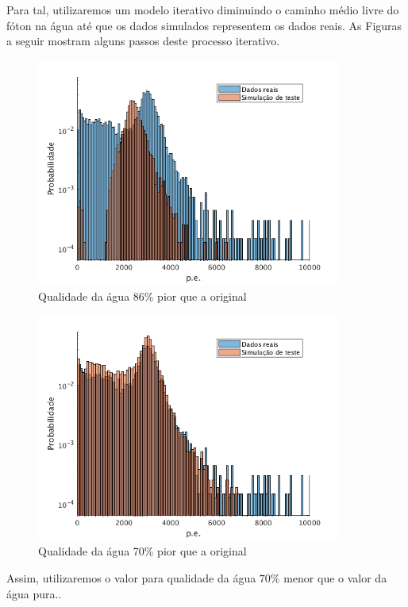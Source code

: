 Para tal, utilizaremos um modelo iterativo diminuindo o caminho médio livre do fóton na água até que os dados simulados representem os dados reais. As Figuras a seguir mostram alguns passos deste processo iterativo.



\begin{figure}[H]
\centering
\includegraphics[width=10cm]{textuais/simulacao/figuras/hist_evt3.png}
\caption{Qualidade da água 86\% pior que a original}
\label{fig:a3}
\end{figure}

\begin{figure}[H]
	\centering
	\includegraphics[width=10cm]{textuais/simulacao/figuras/hist_evt4.png}
	\caption{Qualidade da água 70\% pior que a original}
	\label{fig:a4}
\end{figure}

Assim, utilizaremos o valor para qualidade da água $70\%$ menor que o valor da água pura..


